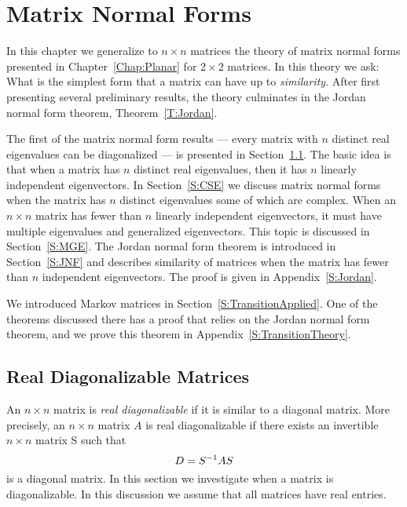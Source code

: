 \chapter{Matrix Normal Forms}
\label{C:HDeigenvalues}

\normalsize
 
In this chapter we generalize to $n\times n$ matrices the theory of matrix 
normal forms presented in Chapter~\ref{Chap:Planar} for $2\times 2$ 
matrices.  In this theory we ask: What is the simplest form that a matrix 
can have up to {\em similarity\/}.  After first presenting several 
preliminary results, the theory culminates in the Jordan normal form theorem, Theorem~\ref{T:Jordan}. 

The first of the matrix normal form results --- every matrix with 
$n$ distinct real eigenvalues can be diagonalized --- is presented 
in Section~\ref{S:RDM}.  The basic idea is that when a matrix has $n$
distinct real eigenvalues, then it has $n$ linearly independent 
eigenvectors.  In Section~\ref{S:CSE} we discuss matrix normal forms 
when the matrix has $n$ distinct eigenvalues some of which are complex.  
When an $n\times n$ matrix has fewer than $n$ linearly independent 
eigenvectors, it must have multiple eigenvalues and generalized eigenvectors.  
This topic is discussed in Section~\ref{S:MGE}.  The Jordan normal form theorem 
is introduced in Section~\ref{S:JNF} and describes similarity of matrices when 
the matrix has fewer than $n$ independent eigenvectors.  The proof is 
given in Appendix~\ref{S:Jordan}.

We introduced Markov matrices in Section~\ref{S:TransitionApplied}.  
One of the theorems discussed there has a proof that relies on the 
Jordan normal form theorem, and we prove this theorem in 
Appendix~\ref{S:TransitionTheory}.
 




\section{Real Diagonalizable Matrices} 
\label{S:RDM}

An $n\times n$ matrix is {\em real diagonalizable\/}
 if it is similar  to a
diagonal matrix.  More precisely, 
an $n\times n$ matrix $A$ is
real diagonalizable if there exists an invertible $n\times n$
matrix S such that
\[
D=S^{-1} AS
\]
is a diagonal matrix.  In this section we investigate when a
matrix is diagonalizable.  In this discussion we assume that all
matrices have real entries.

